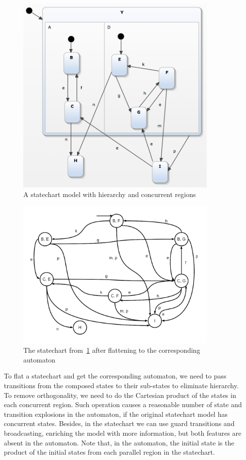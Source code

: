\begin{figure}[htb]
\centering
\includegraphics[width=10cm]{figuras/statechartExample2}
\caption{\label{fig:stateFlat} A statechart model with hierarchy and concurrent regions}
\end{figure}

\begin{figure}[htb]
\centering
\includegraphics[width=10cm]{figuras/flatState}
\caption{\label{fig:flatStateNFA} The statechart from~\ref{fig:stateFlat} after flattening to the corresponding automaton}
\end{figure}

To flat a statechart and get the corresponding automaton, we need to pass transitions from the composed states to their sub-states to eliminate hierarchy. To remove orthogonality, we need to do the Cartesian product of the states in each concurrent region. Such operation causes a reasonable number of state and transition explosions in the automaton, if the original statechart model has concurrent states. Besides, in the statechart we can use guard transitions and broadcasting, enriching the model with more information, but both features are absent in the automaton. Note that, in the automaton, the initial state is the product of the initial states from each parallel region in the statechart.
